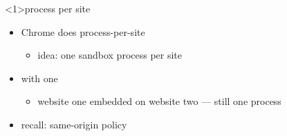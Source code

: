\begin{frame}<1>{process per site}
    \begin{itemize}
    \item Chrome  does process-per-site
        \begin{itemize}
        \item idea: one sandbox process per site
        \end{itemize}
    \item with one 
        \begin{itemize}
        \item<2> website one embedded on website two --- still one process
        \end{itemize}
    \item recall: same-origin policy
    \end{itemize}
\end{frame}

